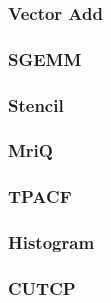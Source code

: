 
\subsubsection{Vector Add}

\subsubsection{SGEMM}

\subsubsection{Stencil}

\subsubsection{MriQ}

\subsubsection{TPACF}

\subsubsection{Histogram}

\subsubsection{CUTCP}
